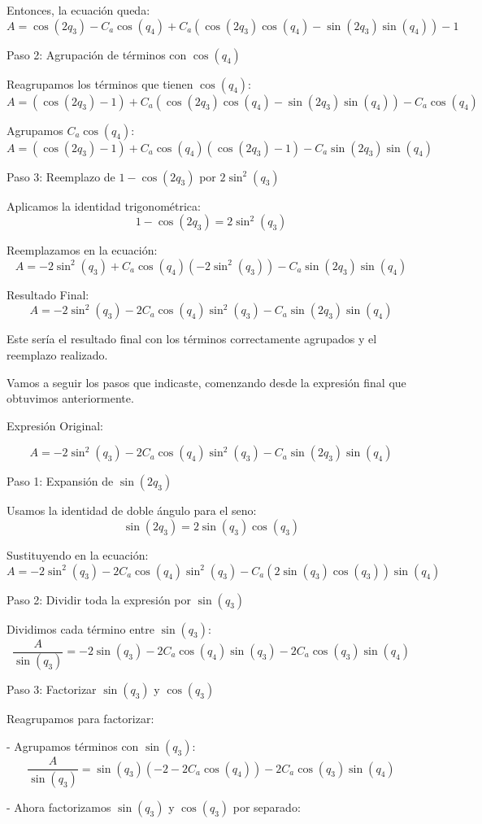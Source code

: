 \documentclass[a4paper,12pt]{article}
\begin{document}
Entonces, la ecuación queda:
\[
A = \cos(2q_3) - C_a \cos(q_4) + C_a (\cos(2q_3)\cos(q_4) - \sin(2q_3)\sin(q_4)) - 1
\]

Paso 2: Agrupación de términos con \(\cos(q_4)\)

Reagrupamos los términos que tienen \(\cos(q_4)\):
\[
A = (\cos(2q_3) - 1) + C_a (\cos(2q_3)\cos(q_4) - \sin(2q_3)\sin(q_4)) - C_a \cos(q_4)
\]

Agrupamos \(C_a \cos(q_4)\):
\[
A = (\cos(2q_3) - 1) + C_a \cos(q_4)(\cos(2q_3) - 1) - C_a \sin(2q_3)\sin(q_4)
\]

Paso 3: Reemplazo de \(1 - \cos(2q_3)\) por \(2\sin^2(q_3)\)

Aplicamos la identidad trigonométrica:
\[
1 - \cos(2q_3) = 2\sin^2(q_3)
\]

Reemplazamos en la ecuación:
\[
A = -2\sin^2(q_3) + C_a \cos(q_4)(-2\sin^2(q_3)) - C_a \sin(2q_3)\sin(q_4)
\]

Resultado Final:
\[
A = -2\sin^2(q_3) - 2C_a \cos(q_4)\sin^2(q_3) - C_a \sin(2q_3)\sin(q_4)
\]

Este sería el resultado final con los términos correctamente agrupados y el reemplazo realizado.

Vamos a seguir los pasos que indicaste, comenzando desde la expresión final que obtuvimos anteriormente.

Expresión Original:

\[
A = -2\sin^2(q_3) - 2C_a \cos(q_4)\sin^2(q_3) - C_a \sin(2q_3)\sin(q_4)
\]

Paso 1: Expansión de \(\sin(2q_3)\)

Usamos la identidad de doble ángulo para el seno:
\[
\sin(2q_3) = 2\sin(q_3)\cos(q_3)
\]

Sustituyendo en la ecuación:
\[
A = -2\sin^2(q_3) - 2C_a \cos(q_4)\sin^2(q_3) - C_a (2\sin(q_3)\cos(q_3))\sin(q_4)
\]

Paso 2: Dividir toda la expresión por \(\sin(q_3)\)

Dividimos cada término entre \(\sin(q_3)\):
\[
\frac{A}{\sin(q_3)} = -2\sin(q_3) - 2C_a \cos(q_4)\sin(q_3) - 2C_a \cos(q_3)\sin(q_4)
\]

Paso 3: Factorizar \(\sin(q_3)\) y \(\cos(q_3)\)

Reagrupamos para factorizar:

- Agrupamos términos con \(\sin(q_3)\):
\[
\frac{A}{\sin(q_3)} = \sin(q_3)(-2 - 2C_a \cos(q_4)) - 2C_a \cos(q_3)\sin(q_4)
\]

- Ahora factorizamos \(\sin(q_3)\) y \(\cos(q_3)\) por separado:
\end{document}
